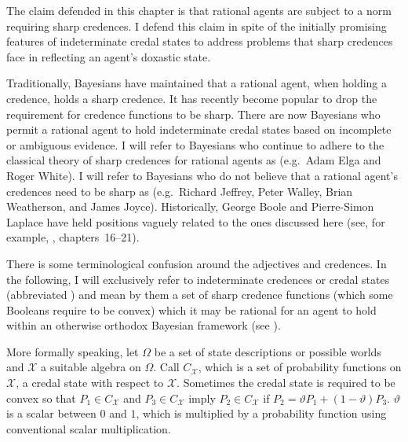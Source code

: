 \documentclass[phd,12pt,oneside]{ubcthesis}
\begin{document}
The claim defended in this chapter is that rational agents are subject
to a norm requiring sharp credences. I defend this claim in spite of
the initially promising features of indeterminate credal states to
address problems that sharp credences face in reflecting an agent's
doxastic state.

Traditionally, Bayesians have maintained that a rational agent, when
holding a credence, holds a sharp credence. It has recently become
popular to drop the requirement for credence functions to be sharp.
There are now Bayesians who permit a rational agent to hold
indeterminate credal states based on incomplete or ambiguous evidence.
I will refer to Bayesians who continue to adhere to the classical
theory of sharp credences for rational agents as 
(e.g.\ Adam Elga and Roger White). I will refer to Bayesians who do
not believe that a rational agent's credences need to be sharp as
 (e.g.\ Richard Jeffrey, Peter Walley, Brian
Weatherson, and James Joyce). Historically, George Boole and
Pierre-Simon Laplace have held positions vaguely related to the ones
discussed here (see, for example, ,
chapters~16--21).

There is some terminological confusion around the adjectives
  and  credences.
In the following, I will exclusively refer to indeterminate credences
or credal states (abbreviated ) and mean by them a set
of sharp credence functions (which some Booleans require to be convex)
which it may be rational for an agent to hold within an otherwise
orthodox Bayesian framework (see ). 

More formally speaking, let $\Omega$ be a set of state descriptions or
possible worlds and $\mathcal{X}$ a suitable algebra on $\Omega$. Call
$C_{\mathcal{X}}$, which is a set of probability functions on
$\mathcal{X}$, a credal state with respect to $\mathcal{X}$. Sometimes
the credal state is required to be convex so that
$P_{1}\in{}C_{\mathcal{X}}$ and $P_{3}\in{}C_{\mathcal{X}}$ imply
$P_{2}\in{}C_{\mathcal{X}}$ if
$P_{2}=\vartheta{}P_{1}+(1-\vartheta)P_{3}$. $\vartheta$ is a scalar
between $0$ and $1$, which is multiplied by a probability function
using conventional scalar multiplication.

\end{document}
